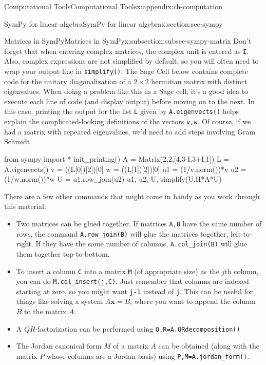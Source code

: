 \documentclass[oneside,10pt,]{book}
\newcommand{\mono}[1]{\texttt{#1}}
\numberwithin{equation}{section}
\newcommand{\xx}{\mathbf{x}}
\begin{document}
\begin{appendixptx}{Computational Tools}{}{Computational Tools}{}{}{x:appendix:ch-computation}
\begin{sectionptx}{SymPy for linear algebra}{}{SymPy for linear algebra}{}{}{x:section:sec-sympy}
\begin{subsectionptx}{Matrices in SymPy}{}{Matrices in SymPy}{}{}{x:subsection:subsec-sympy-matrix}
Don't forget that when entering complex matrices, the complex unit is entered as \mono{I}. Also, complex expressions are not simplified by default, so you will often need to wrap your output line in \mono{simplify()}. The Sage Cell below contains complete code for the unitary diagonalization of a \(2\times 2\) hermitian matrix with distinct eigenvalues. When doing a problem like this in a Sage cell, it's a good idea to execute each line of code (and display output) before moving on to the next. In this case, printing the output for the list \mono{L} given by \mono{A.eigenvects()} helps explain the complicated-looking definitions of the vectors \mono{v,w}. Of course, if we had a matrix with repeated eigenvalues, we'd need to add steps involving Gram Schmidt.%
\begin{sageinput}
from sympy import *
init_printing()
A = Matrix(2,2,[4,3-I,3+I,1])
L = A.eigenvects()
v = ((L[0])[2])[0]
w = ((L[1])[2])[0]
u1 = (1/v.norm())*v
u2 = (1/w.norm())*w
U = u1.row_join(u2)
u1, u2, U, simplify(U.H*A*U)
\end{sageinput}
There are a few other commands that might come in handy as you work through this material:%
\begin{itemize}[label=\textbullet]
\item{}Two matrices can be glued together. If matrices \mono{A,B} have the same number of rows, the command \mono{A.row\_join(B)} will glue the matrices together, left-to-right. If they have the same number of columns, \mono{A.col\_join(B)} will glue them together top-to-bottom.%
\item{}To insert a column \mono{C} into a matrix \mono{M} (of appropriate size) as the \(j\)th column, you can do \mono{M.col\_insert(j,C)}. Just remember that columns are indexed starting at zero, so you might want \mono{j-1} instead of \mono{j}. This can be useful for things like solving a system \(A\xx=B\), where you want to append the column \(B\) to the matrix \(A\).%
\item{}A \(QR\)-factorization can be performed using \mono{Q,R=A.QRdecomposition()}%
\item{}The Jordan canonical form \(M\) of a matrix \(A\) can be obtained (along with the matrix \(P\) whose columns are a Jordan basis) using \mono{P,M=A.jordan\_form()}.%
\end{itemize}
%
\end{subsectionptx}
\end{sectionptx}
\end{appendixptx}
\end{document}
